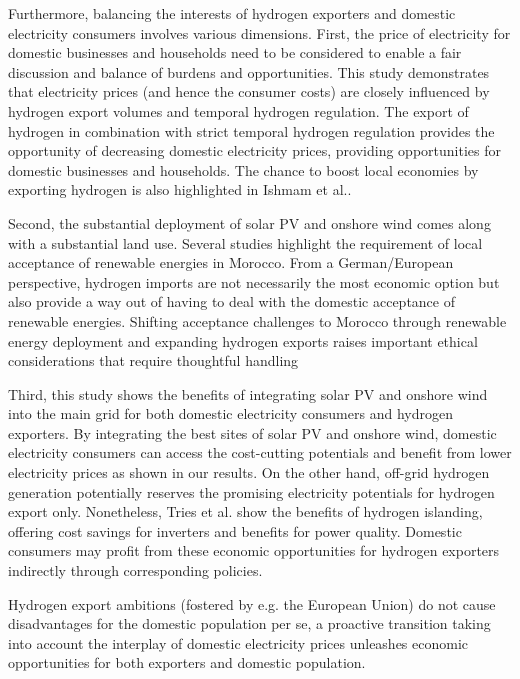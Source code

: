 \documentclass[5p,numafflabel]{elsarticle}
\begin{document}
Furthermore, balancing the interests of hydrogen exporters and domestic electricity consumers involves various dimensions.
First, the price of electricity for domestic businesses and households need to be considered to enable a fair discussion and balance of burdens and opportunities. 
This study demonstrates that electricity prices (and hence the consumer costs) are closely influenced by hydrogen export volumes and temporal hydrogen regulation. 
The export of hydrogen in combination with strict temporal hydrogen regulation provides the opportunity of decreasing domestic electricity prices, providing opportunities for domestic businesses and households. The chance to boost local economies by exporting hydrogen is also highlighted in Ishmam et al.\cite{Ishmam2024}.

Second, the substantial deployment of solar PV and onshore wind comes along with a substantial land use. Several studies \cite{Terrapon-Pfaff2019, Hanger2016} highlight the requirement of local acceptance of renewable energies in Morocco. From a German/European perspective, hydrogen imports are not necessarily the most economic option \cite{Merten2023} but also provide a way out of having to deal with the domestic acceptance of renewable energies.
Shifting acceptance challenges to Morocco through renewable energy deployment and expanding hydrogen exports raises important ethical considerations that require thoughtful handling

Third, this study shows the benefits of integrating solar PV and onshore wind into the main grid for both domestic electricity consumers and hydrogen exporters. By integrating the best sites of solar PV and onshore wind, domestic electricity consumers can access the cost-cutting potentials and benefit from lower electricity prices as shown in our results. On the other hand, off-grid hydrogen generation potentially reserves the promising electricity potentials for hydrogen export only. Nonetheless, Tries et al.\cite{Tries2023b} show the benefits of hydrogen islanding, offering cost savings for inverters and benefits for power quality. Domestic consumers may profit from these economic opportunities for hydrogen exporters indirectly through corresponding policies.

Hydrogen export ambitions (fostered by e.g. the European Union) do not cause disadvantages for the domestic population per se, a proactive transition taking into account the interplay of domestic electricity prices unleashes economic opportunities for both exporters and domestic population.
\end{document}
